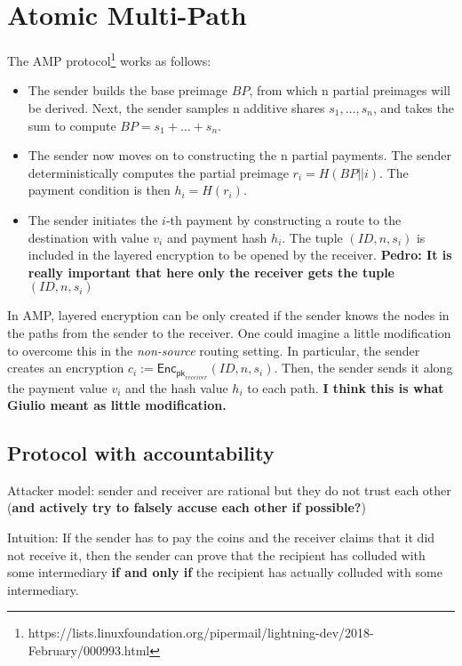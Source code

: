 \section{Atomic Multi-Path}

The AMP protocol\footnote{https://lists.linuxfoundation.org/pipermail/lightning-dev/2018-February/000993.html} works as follows:

\begin{itemize}
	\item The sender builds the base preimage $\textit{BP}$, from which n 
	partial preimages will be derived. Next, the sender samples n additive shares $s_1,\ldots, s_n$, and takes the sum to compute 
	$\textit{BP} = s_1 + \ldots + s_n$.
	
	\item The sender now moves on to constructing the
n partial payments. The sender deterministically
computes the partial preimage $r_i = H(\textit{BP} ||  i)$. The payment 
condition is then $h_i = H(r_i)$. 

	\item The sender initiates the $i$-th payment by
constructing a route to the destination with 
value $v_i$ and payment hash $h_i$.
The tuple $(\textit{ID}, n, s_i)$ is included in the layered encryption 
to be opened by the receiver. {\bf Pedro: It is really important 
that here only the receiver gets the tuple $(\textit{ID}, n, s_i)$}
\end{itemize}


 In AMP, layered encryption can be only created if the sender knows the nodes in the paths from the sender to the receiver. One could imagine a little modification to overcome this in the \emph{non-source} routing setting. In particular, the sender creates an encryption $c_i := \textsf{Enc}_{\textsf{pk}_{\textit{receiver}}}(\textit{ID}, n, s_i)$. Then, the sender sends it along the payment value $v_i$ and the hash value $h_i$ to each path. \textbf{I think this is what Giulio meant as little modification.}
 
\subsection{Protocol with accountability}

Attacker model: sender and receiver are rational but they do not trust each other (\textbf{and actively try to falsely accuse each other if possible?})

Intuition: If the sender has to pay the coins and the receiver claims that it did not receive it, then the sender can prove that the recipient has colluded with some intermediary \textbf{if and only if} the recipient has actually colluded with some intermediary.


